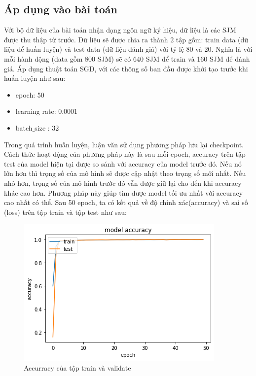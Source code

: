 \subsection{Áp dụng vào bài toán}
Với bộ dữ liệu của bài toán nhận dạng ngôn ngữ ký hiệu, dữ liệu là các SJM được thu thập từ trước. Dữ liệu sẽ được chia ra thành 2 tập gồm: train data (dữ liệu để huấn luyện) và test data (dữ liệu đánh giá) với tỷ lệ 80 và 20. Nghĩa là với mỗi hành động (data gồm 800 SJM) sẽ có 640 SJM để train và 160 SJM để đánh giá.
Áp dụng thuật toán SGD, với các thông số ban đầu được khởi tạo trước khi huấn luyện như sau:
\begin{itemize}
\item epoch: 50
\item learning rate: 0.0001
\item batch$\_$size : 32
\end{itemize}
Trong quá trình huấn luyện, luận văn sử dụng phương pháp lưu lại checkpoint. Cách thức hoạt động của phương pháp này là sau mỗi epoch, accuracy trên tập test của model hiện tại được so sánh với accuracy của model trước đó. Nếu nó lớn hơn thì trọng số của mô hình sẽ được cập nhật theo trọng số mới nhất. Nếu nhỏ hơn, trọng số của mô hình trước đó vẫn được giữ lại cho đến khi accuracy khác cao hơn. Phương pháp này giúp tìm được model tối ưu nhất với accuracy cao nhất có thể.
Sau 50 epoch, ta có kết quả về độ chính xác(accuracy) và sai số (loss) trên tập train và tập test như sau:
\FloatBarrier
\begin{figure}[htp]
\begin{center}
\includegraphics[scale=1]{chap4/c4_figs/train_val_acc.png}
\end{center}
\caption{Accurracy của tập train và validate}
\label{fig:pipelineS}
\end{figure}
\FloatBarrier

